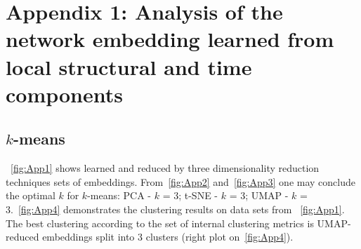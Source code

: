 \chapter{Appendix 1: Analysis of the network embedding learned from local structural and time components}
\label{appendix:k-means_time}

\section{$k$-means}
~\autoref{fig:App1} shows learned and reduced by three dimensionality reduction techniques sets of embeddings. From~\autoref{fig:App2} and~\autoref{fig:App3} one may conclude the optimal $k$ for $k$-means: PCA - $k$ = 3; t-SNE - $k$ = 3; UMAP - $k$ = 3.~\autoref{fig:App4} demonstrates the clustering results on data sets from ~\autoref{fig:App1}. The best clustering according to the set of internal clustering metrics is UMAP-reduced embeddings split into 3 clusters (right plot on~\autoref{fig:App4}).

